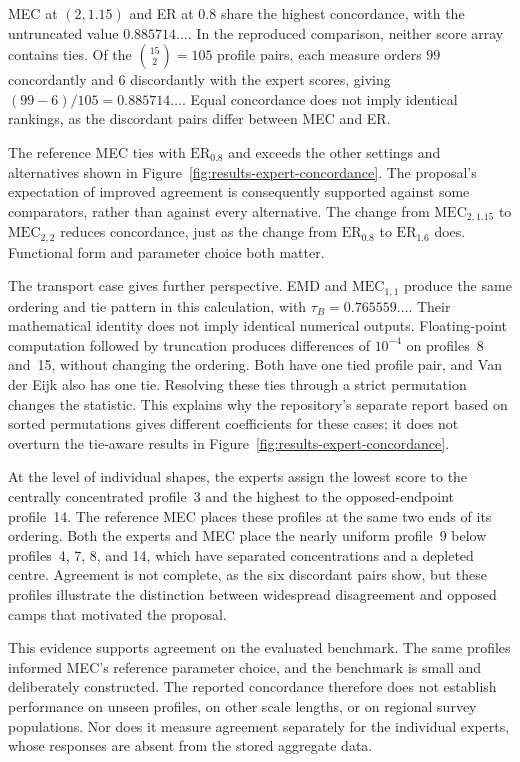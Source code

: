 \documentclass{article}
\theoremstyle{plain}
\theoremstyle{remark}
\begin{document}
MEC at $(2,1.15)$ and ER at $0.8$ share the highest concordance, with the untruncated value $0.885714\ldots$. In the reproduced comparison, neither score array contains ties. Of the $\binom{15}{2}=105$ profile pairs, each measure orders $99$ concordantly and $6$ discordantly with the expert scores, giving $(99-6)/105=0.885714\ldots$. Equal concordance does not imply identical rankings, as the discordant pairs differ between MEC and ER.

The reference MEC ties with $\mathrm{ER}_{0.8}$ and exceeds the other settings and alternatives shown in Figure~\ref{fig:results-expert-concordance}. The proposal's expectation of improved agreement is consequently supported against some comparators, rather than against every alternative. The change from $\mathrm{MEC}_{2,1.15}$ to $\mathrm{MEC}_{2,2}$ reduces concordance, just as the change from $\mathrm{ER}_{0.8}$ to $\mathrm{ER}_{1.6}$ does. Functional form and parameter choice both matter.

The transport case gives further perspective. EMD and $\mathrm{MEC}_{1,1}$ produce the same ordering and tie pattern in this calculation, with $\tau_B=0.765559\ldots$. Their mathematical identity does not imply identical numerical outputs. Floating-point computation followed by truncation produces differences of $10^{-4}$ on profiles~8 and~15, without changing the ordering. Both have one tied profile pair, and Van der Eijk also has one tie. Resolving these ties through a strict permutation changes the statistic. This explains why the repository's separate report based on sorted permutations gives different coefficients for these cases; it does not overturn the tie-aware results in Figure~\ref{fig:results-expert-concordance}.

At the level of individual shapes, the experts assign the lowest score to the centrally concentrated profile~3 and the highest to the opposed-endpoint profile~14. The reference MEC places these profiles at the same two ends of its ordering. Both the experts and MEC place the nearly uniform profile~9 below profiles~4, 7, 8, and 14, which have separated concentrations and a depleted centre. Agreement is not complete, as the six discordant pairs show, but these profiles illustrate the distinction between widespread disagreement and opposed camps that motivated the proposal.

This evidence supports agreement on the evaluated benchmark. The same profiles informed MEC's reference parameter choice, and the benchmark is small and deliberately constructed. The reported concordance therefore does not establish performance on unseen profiles, on other scale lengths, or on regional survey populations. Nor does it measure agreement separately for the individual experts, whose responses are absent from the stored aggregate data.
\end{document}
